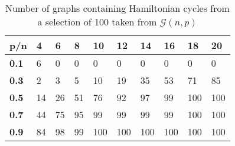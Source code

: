 \documentclass[10pt,a4paper]{report}
\begin{document}

\begin{table}[ht]
\centering
\begin{tabular}{|l|l|l|l|l|l|l|l|l|l|}
\hline
\textbf{p/n} & \textbf{4} & \textbf{6} & \textbf{8} & \textbf{10} & \textbf{12} & \textbf{14} & \textbf{16} & \textbf{18} & \textbf{20} \\ \hline
\textbf{0.1} & 6          & 0          & 0          & 0           & 0           & 0           & 0           & 0           & 0           \\ \hline
\textbf{0.3} & 2          & 3          & 5          & 10          & 19          & 35          & 53          & 71          & 85          \\ \hline
\textbf{0.5} & 14         & 26         & 51         & 76          & 92          & 97          & 99          & 100         & 100         \\ \hline
\textbf{0.7} & 44         & 75         & 95         & 99          & 99          & 99          & 99          & 100         & 100         \\ \hline
\textbf{0.9} & 84         & 98         & 99         & 100         & 100         & 100         & 100         & 100         & 100         \\ \hline
\end{tabular}
\caption{Number of graphs containing Hamiltonian cycles from a selection of 100 taken from $
\mathcal{G}(n,p)$}
\label{tab:my-table}
\end{table}
\end{document}
